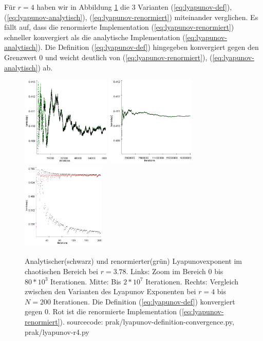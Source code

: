 \documentclass[12pt,a4paper]{article}
\begin{document}
Für $r=4$ haben wir in Abbildung \ref{fig:lyapunov-chaos} die 3 Varianten (\ref{eq:lyapunov-def}), (\ref{eq:lyapunov-analytisch}), (\ref{eq:lyapunov-renormiert}) miteinander verglichen. Es fällt auf, dass die renormierte Implementation (\ref{eq:lyapunov-renormiert}) schneller konvergiert als die analytische Implementation (\ref{eq:lyapunov-analytisch}). 
Die Definition (\ref{eq:lyapunov-def}) hingegeben konvergiert gegen den Grenzwert 0 und weicht deutlich von (\ref{eq:lyapunov-renormiert}), (\ref{eq:lyapunov-analytisch}) ab.
\begin{figure}[!htbp]
\centering
\includegraphics[height=160px]{lya378-zoom}
\includegraphics[height=160px]{lya378}
\includegraphics[height=160px, width=150px]{lyapunov_r4}
\caption{Analytischer(schwarz) und renormierter(grün) Lyapunovexponent im chaotischen Bereich bei $r=3.78$. Links: Zoom im Bereich 0 bis $80*10^3$ Iterationen. Mitte: Bis $2*10^7$ Iterationen. Rechts: Vergleich zwischen den Varianten des Lyapunov Exponenten bei $r=4$ bis $N=200$ Iterationen. Die Definition (\ref{eq:lyapunov-def}) konvergiert gegen 0. Rot ist die renormierte Implementation (\ref{eq:lyapunov-renormiert}). sourcecode: prak/lyapunov-definition-convergence.py, prak/lyapunov-r4.py}
\label{fig:lyapunov-chaos}
\end{figure}
\end{document}
